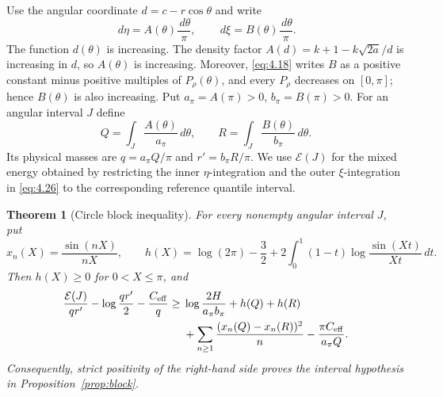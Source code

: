 \documentclass[11pt]{article}
\numberwithin{equation}{section}
\theoremstyle{plain}
\newtheorem{theorem}{Theorem}[section]
\theoremstyle{definition}
\theoremstyle{remark}
\newcommand{\1}{\mathbf 1}
\newcommand{\dd}{\,d}
\newcommand{\E}{\mathcal E}
\begin{document}
Use the angular coordinate $d=c-r\cos\theta$ and write
\[
 \dd\eta=A(\theta)\frac{\dd\theta}{\pi},\qquad
 \dd\xi=B(\theta)\frac{\dd\theta}{\pi}.
\]
The function $d(\theta)$ is increasing.  The density factor
$A(d)=k+1-k\sqrt{2a}/d$ is increasing in $d$, so $A(\theta)$ is
increasing.  Moreover, \eqref{eq:4.18} writes $B$ as a positive constant minus
positive multiples of $P_\rho(\theta)$, and every $P_\rho$ decreases on
$[0,\pi]$; hence $B(\theta)$ is also increasing.  Put
$a_\pi=A(\pi)>0$, $b_\pi=B(\pi)>0$.  For an angular interval $J$ define
\begin{equation}
 Q=\int_J\frac{A(\theta)}{a_\pi}\dd\theta,\qquad
 R=\int_J\frac{B(\theta)}{b_\pi}\dd\theta.
\label{eq:5.1}
\end{equation}
Its physical masses are $q=a_\pi Q/\pi$ and $r'=b_\pi R/\pi$.  We use
$\E(J)$ for the mixed energy obtained by restricting the inner
$\eta$-integration and the outer $\xi$-integration in \eqref{eq:4.26} to the
corresponding reference quantile interval.

\begin{theorem}[Circle block inequality]\label{thm:circle-block}
For every nonempty angular interval $J$, put
\[
 x_n(X)=\frac{\sin(nX)}{nX},\qquad
 h(X)=\log(2\pi)-\frac32
 +2\int_0^1(1-t)\log\frac{\sin(Xt)}{Xt}\dd t.
\]
Then $h(X)\ge0$ for $0<X\le\pi$, and
\[
\begin{aligned}
\frac{\E(J)}{qr'}-\log\frac{qr'}2-\frac{C_{\rm eff}}q
\ge{}&\log\frac{2H}{a_\pi b_\pi}+h(Q)+h(R)\\
&+\sum_{n\ge1}\frac{(x_n(Q)-x_n(R))^2}{n}
-\frac{\pi C_{\rm eff}}{a_\pi Q}.
\end{aligned}
\]
Consequently, strict positivity of the right-hand side proves the interval
hypothesis in Proposition~\ref{prop:block}.
\end{theorem}
\end{document}
